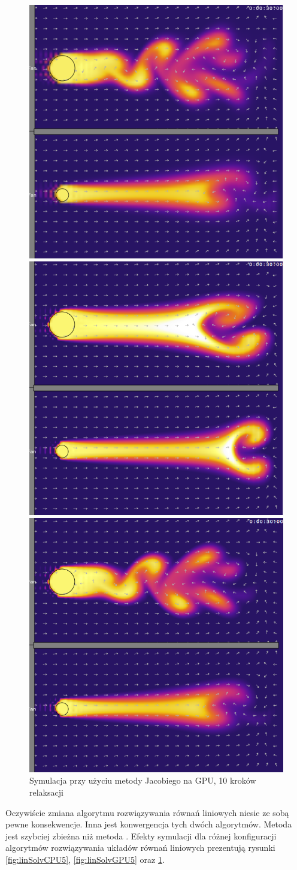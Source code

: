 \begin{figure}[!p]
\centering

\includegraphics[width=.45\textwidth]{img/linSolvCPU5}
\caption{Symulacja przy użyciu metody Gaussa-Seidela na CPU, 
5 kroków relaksacji}
\label{fig:linSolvCPU5}

\includegraphics[width=.45\textwidth]{img/linSolvGPU5}
\caption{Symulacja przy użyciu metody Jacobiego na GPU, 
5 kroków relaksacji}
\label{fig:linSolvGPU5}

\includegraphics[width=.45\textwidth]{img/linSolvGPU10}
\caption{Symulacja przy użyciu metody Jacobiego na GPU, 
10 kroków relaksacji}
\label{fig:linSolvGPU10}

\end{figure}

Oczywiście zmiana algorytmu rozwiązywania równań liniowych niesie ze sobą pewne
konsekwencje. Inna jest konwergencja tych dwóch algorytmów. Metoda  jest szybciej zbieżna niż metoda . Efekty symulacji dla
różnej konfiguracji algorytmów rozwiązywania układów równań liniowych prezentują
rysunki \ref{fig:linSolvCPU5}, \ref{fig:linSolvGPU5} oraz \ref{fig:linSolvGPU10}. 

